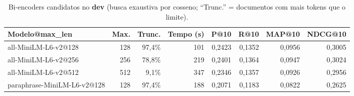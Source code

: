 \begin{table}[t]
\centering
\caption{Bi-encoders candidatos no \textbf{dev} (busca exaustiva por cosseno; ``Trunc.'' = documentos com mais tokens que o limite).}
\label{tab:dev_emb}
\small
\begin{tabular}{lrrrrrrr}
\toprule
Modelo@max\_len & Max. & Trunc. & Tempo (s) & P@10 & R@10 & MAP@10 & NDCG@10 \\
\midrule
all-MiniLM-L6-v2@128 & 128 & 97,4\% & 101 & 0,2423 & 0,1352 & 0,0956 & 0,3005 \\
all-MiniLM-L6-v2@256 & 256 & 78,8\% & 219 & 0,2401 & 0,1364 & 0,0947 & 0,3024 \\
all-MiniLM-L6-v2@512 & 512 & 9,1\% & 347 & 0,2346 & 0,1357 & 0,0926 & 0,2956 \\
paraphrase-MiniLM-L6-v2@128 & 128 & 97,4\% & 188 & 0,2071 & 0,1183 & 0,0822 & 0,2625 \\
\bottomrule
\end{tabular}
\end{table}
